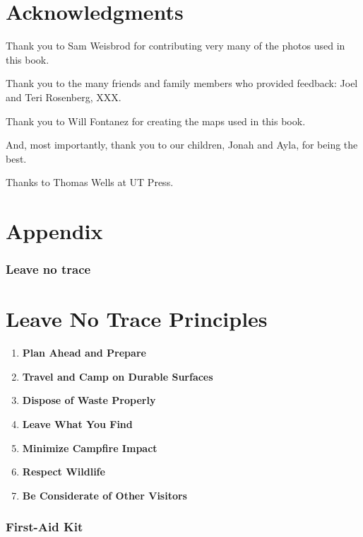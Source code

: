 \documentclass[
  letterpaper,
  DIV=11,
  numbers=noendperiod]{scrreprt}
\begin{document}
\chapter{Acknowledgments}\label{acknowledgments}

Thank you to Sam Weisbrod for contributing very many of the photos used
in this book.

Thank you to the many friends and family members who provided feedback:
Joel and Teri Rosenberg, XXX.

Thank you to Will Fontanez for creating the maps used in this book.

And, most importantly, thank you to our children, Jonah and Ayla, for
being the best.

Thanks to Thomas Wells at UT Press.

\chapter{Appendix}\label{appendix}

\subsection{Leave no trace}\label{leave-no-trace}

\chapter{Leave No Trace Principles}\label{leave-no-trace-principles}

\begin{enumerate}
\def\labelenumi{\arabic{enumi}.}
\item
  \textbf{Plan Ahead and Prepare}
\item
  \textbf{Travel and Camp on Durable Surfaces}
\item
  \textbf{Dispose of Waste Properly}
\item
  \textbf{Leave What You Find}
\item
  \textbf{Minimize Campfire Impact}
\item
  \textbf{Respect Wildlife}
\item
  \textbf{Be Considerate of Other Visitors}
\end{enumerate}

\subsection{First-Aid Kit}\label{first-aid-kit}
\end{document}
